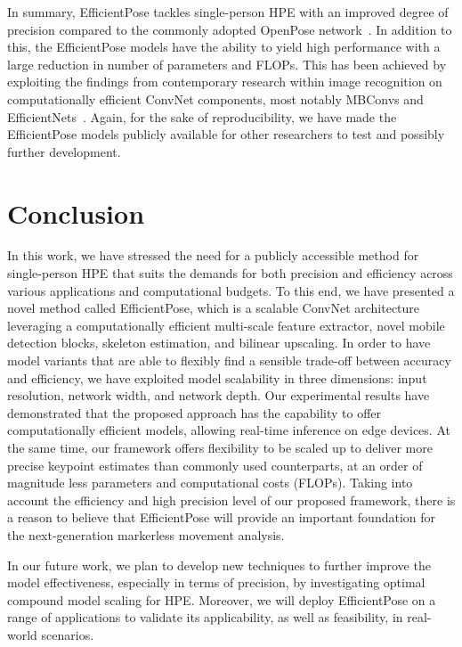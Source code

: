 In summary, EfficientPose tackles single-person HPE with an improved degree of precision compared to the commonly adopted OpenPose network~\cite{cao2018openpose}. In addition to this, the EfficientPose models have the ability to yield high performance with a large reduction in number of parameters and FLOPs. This has been achieved by exploiting the findings from contemporary research within image recognition on computationally efficient ConvNet components, most notably MBConvs and EfficientNets~\cite{sandler2018mobilenetv2, tan2019efficientnet}. Again, for the sake of reproducibility, we have made the EfficientPose models publicly available for other researchers to test and possibly further development. 


\section{Conclusion}
\label{sec:conclusion}

In this work, we have stressed the need for a publicly accessible method for single-person HPE that suits the demands for both precision and efficiency across various applications and computational budgets. To this end, we have presented a novel method called EfficientPose, which is a scalable ConvNet architecture leveraging a computationally efficient multi-scale feature extractor, novel mobile detection blocks, skeleton estimation, and bilinear upscaling. In order to have model variants that are able to flexibly find a sensible trade-off between accuracy and efficiency, we have exploited model scalability in three dimensions: input resolution, network width, and network depth. Our experimental results have demonstrated that the proposed approach has the capability to offer computationally efficient models, allowing real-time inference on edge devices. At the same time, our framework offers flexibility to be scaled up to deliver more precise keypoint estimates than commonly used counterparts, at an order of magnitude less parameters and computational costs (FLOPs). Taking into account the efficiency and high precision level of our proposed framework, there is a reason to believe that EfficientPose will provide an important foundation for the next-generation markerless movement analysis. 

In our future work, we plan to develop new techniques to further improve the model effectiveness, especially in terms of precision, by investigating optimal compound model scaling for HPE. Moreover, we will deploy EfficientPose on a range of applications to validate its applicability, as well as feasibility, in real-world scenarios.

